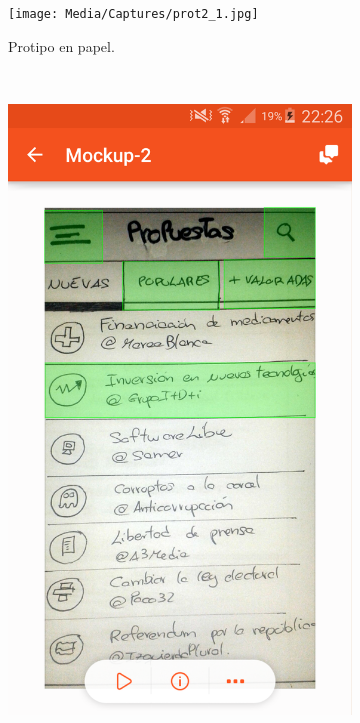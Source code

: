 \begin{enumerate}[label=\textbf{\arabic*})]
	\begin{figure}[!]
        \centering
        \begin{subfigure}[b]{0.3\textwidth}
                \texttt{[image: Media/Captures/prot2\_1.jpg]}
                \caption{Protipo en papel.}
                \label{fig:quipDesktop}
        \end{subfigure}
        ~
        \begin{subfigure}[b]{0.3\textwidth}
                \includegraphics[width=\textwidth]{Media/Captures/prot2_2.png}

\end{subfigure}
\end{figure}
\end{enumerate}
